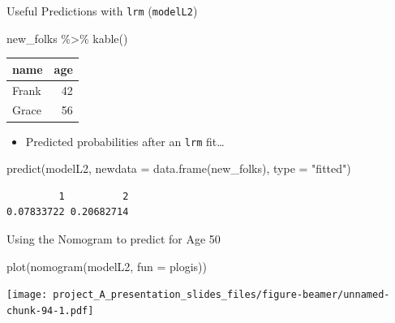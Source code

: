 \documentclass[
  ignorenonframetext,
]{beamer}
\newenvironment{Shaded}{\begin{snugshade}}{\end{snugshade}}
\newcommand{\AttributeTok}[1]{\textcolor[rgb]{0.77,0.63,0.00}{#1}}
\newcommand{\FunctionTok}[1]{\textcolor[rgb]{0.00,0.00,0.00}{#1}}
\newcommand{\NormalTok}[1]{#1}
\newcommand{\SpecialCharTok}[1]{\textcolor[rgb]{0.00,0.00,0.00}{#1}}
\newcommand{\StringTok}[1]{\textcolor[rgb]{0.31,0.60,0.02}{#1}}
\providecommand{\tightlist}{%
  \setlength{\itemsep}{0pt}\setlength{\parskip}{0pt}}
\begin{document}
\begin{frame}[fragile]{Useful Predictions with \texttt{lrm}
(\texttt{modelL2})}
\protect\hypertarget{useful-predictions-with-lrm-modell2}{}
\begin{Shaded}
\begin{Highlighting}[]
\NormalTok{new\_folks }\SpecialCharTok{\%\textgreater{}\%} \FunctionTok{kable}\NormalTok{()}
\end{Highlighting}
\end{Shaded}

\begin{longtable}[]{@{}lr@{}}
\toprule
name & age \\
\midrule
\endhead
Frank & 42 \\
Grace & 56 \\
\bottomrule
\end{longtable}

\begin{itemize}
\tightlist
\item
  Predicted probabilities after an \texttt{lrm} fit\ldots{}
\end{itemize}

\begin{Shaded}
\begin{Highlighting}[]
\FunctionTok{predict}\NormalTok{(modelL2, }\AttributeTok{newdata =} \FunctionTok{data.frame}\NormalTok{(new\_folks),}
        \AttributeTok{type =} \StringTok{"fitted"}\NormalTok{)}
\end{Highlighting}
\end{Shaded}

\begin{verbatim}
         1          2 
0.07833722 0.20682714 
\end{verbatim}
\end{frame}

\begin{frame}[fragile]{Using the Nomogram to predict for Age 50}
\protect\hypertarget{using-the-nomogram-to-predict-for-age-50}{}
\begin{Shaded}
\begin{Highlighting}[]
\FunctionTok{plot}\NormalTok{(}\FunctionTok{nomogram}\NormalTok{(modelL2, }\AttributeTok{fun =}\NormalTok{ plogis))}
\end{Highlighting}
\end{Shaded}

\texttt{[image: project\_A\_presentation\_slides\_files/figure-beamer/unnamed-chunk-94-1.pdf]}
\end{frame}
\end{document}
